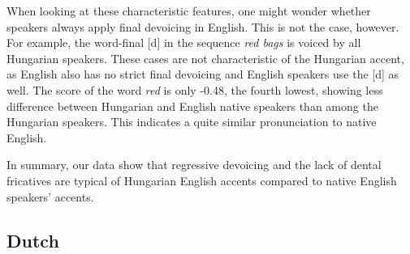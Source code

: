 \documentclass[output=paper]{LSP/langsci}
\begin{document}
When looking at these characteristic features, one might wonder whether speakers always apply final devoicing in English. This is not the case, however. For example, the word-final [d] in the sequence \textit{red bags} is voiced by all Hungarian speakers. These cases are not characteristic of the Hungarian accent, as English also has no strict final devoicing and English speakers use the [d] as well. The score of the word \textit{red} is only -0.48, the fourth lowest, showing less difference between Hungarian and English native speakers than among the Hungarian speakers. This indicates a quite similar pronunciation to native English.

In summary, our data show that regressive devoicing and the lack of dental fricatives are typical of Hungarian English accents compared to native English speakers' accents.

\subsection{Dutch}
\end{document}
